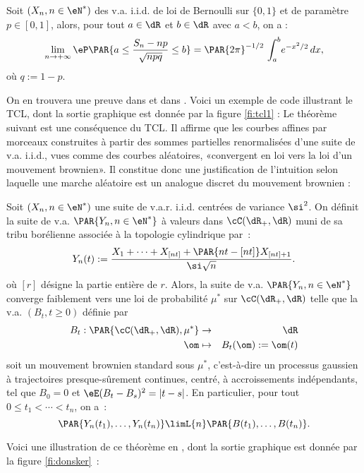\begin{thm}\label{th:moivre-laplace}
  Soit $(X_n,n\in\eN^*)$ des v.a. i.i.d. de loi de Bernoulli sur $\{0,1\}$ et
  de paramètre $p\in[0,1]$, alors, pour tout $a\in\dR$ et $b\in\dR$ avec
  $a<b$, on a :
  $$
  \lim_{n\to+\infty}
  \eP\PAR{a\leq \frac{S_n-np}{\sqrt{npq}}\leq b} 
    =\PAR{2\pi}^{-1/2}\,\int_a^b\!e^{-x^2/2}\,dx,
  $$
  où $q:=1-p$.
\end{thm}
On en trouvera une preuve dans \cite[cor. 8.9]{applebaum} et dans
\cite[expl. V.5.5(i) pages 145-146]{barbe-ledoux}. Voici un exemple de code
\ML{} illustrant le TCL, dont la sortie graphique est donnée par la figure
\ref{fi:tcl1} :
%
%
%
Le théorème suivant est une conséquence du TCL. Il affirme que les courbes
affines par morceaux construites à partir des sommes partielles renormalisées
d'une suite de v.a. i.i.d., vues comme des courbes aléatoires, «convergent en
loi vers la loi d'un mouvement brownien». Il constitue donc une justification
de l'intuition selon laquelle une marche aléatoire est un analogue discret du
mouvement brownien :

\begin{thm}\label{th:pid}
  Soit $(X_n,n\in\eN^*)$ une suite de v.a.r. i.i.d. centrées de variance
  $\si^2$. On définit la suite de v.a. $\PAR{Y_n,n \in \eN^*}$ à valeurs dans
  $\cC(\dR_+,\dR)$ muni de sa tribu borélienne associée à la topologie
  cylindrique par~:
  $$
  Y_n(t):=\frac{X_1+\cdots+X_{[nt]}+\PAR{nt-[nt]}X_{[nt]+1}}{\si\sqrt{n}}.
  $$
  où $[r]$ désigne la partie entière de $r$.  Alors, la suite de v.a.
  $\PAR{Y_n,n\in\eN^*}$ converge faiblement vers une loi de probabilité $\mu^*$
  sur $\cC(\dR_+,\dR)$ telle que la v.a. $(B_t,t\geq0)$ définie par
  \begin{eqnarray*}
  B_t:\PAR{\cC(\dR_+,\dR),\mu^*}&\to&\dR\\
  \om&\mapsto&B_t(\om):=\om(t)
  \end{eqnarray*}
  soit un mouvement brownien standard sous $\mu^*$, c'est-à-dire un processus
  gaussien à trajectoires presque-sûrement continues, centré, à accroissements
  indépendants, tel que $B_0=0$ et $\eE(B_t-B_s)^2=|t-s|$.  En particulier,
  pour tout $0\leq t_1<\cdots<t_n$, on a~:
  $$
  \PAR{Y_n(t_1),\ldots,Y_n(t_n)}\limL{n}\PAR{B(t_1),\ldots,B(t_n)}.
  $$
\end{thm}
Voici une illustration de ce théorème en \ML{}, dont la sortie graphique est
donnée par la figure \ref{fi:donsker}~:
%
%
%

